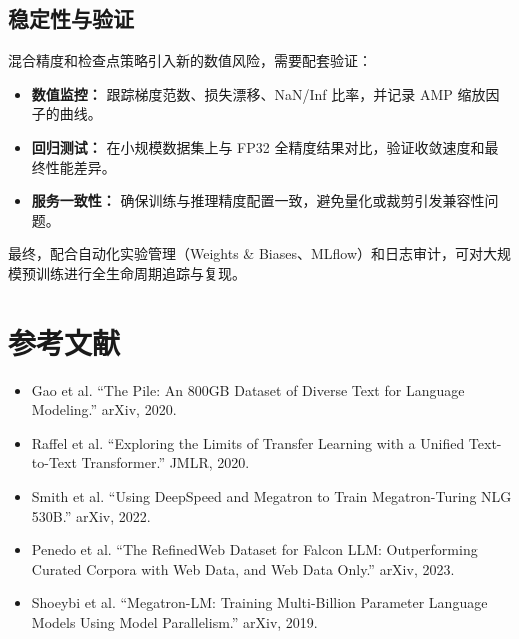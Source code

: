 \documentclass[UTF8,zihao=-4]{ctexart}
\begin{document}
\subsection{稳定性与验证}
混合精度和检查点策略引入新的数值风险，需要配套验证：
\begin{itemize}
  \item \textbf{数值监控：} 跟踪梯度范数、损失漂移、NaN/Inf 比率，并记录 AMP 缩放因子的曲线。
  \item \textbf{回归测试：} 在小规模数据集上与 FP32 全精度结果对比，验证收敛速度和最终性能差异。
  \item \textbf{服务一致性：} 确保训练与推理精度配置一致，避免量化或裁剪引发兼容性问题。
\end{itemize}
最终，配合自动化实验管理（Weights \& Biases、MLflow）和日志审计，可对大规模预训练进行全生命周期追踪与复现。

\section*{参考文献}
\begin{itemize}
  \item Gao et al. ``The Pile: An 800GB Dataset of Diverse Text for Language Modeling.'' arXiv, 2020.
  \item Raffel et al. ``Exploring the Limits of Transfer Learning with a Unified Text-to-Text Transformer.'' JMLR, 2020.
  \item Smith et al. ``Using DeepSpeed and Megatron to Train Megatron-Turing NLG 530B.'' arXiv, 2022.
  \item Penedo et al. ``The RefinedWeb Dataset for Falcon LLM: Outperforming Curated Corpora with Web Data, and Web Data Only.'' arXiv, 2023.
  \item Shoeybi et al. ``Megatron-LM: Training Multi-Billion Parameter Language Models Using Model Parallelism.'' arXiv, 2019.
\end{itemize}
\end{document}
